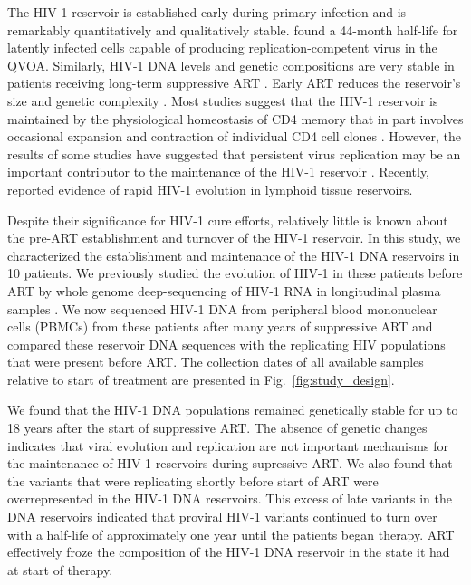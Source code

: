 \documentclass[aps,rmp,onecolumn,linenumbers]{revtex4-1}
\newcommand{\FIG}[1]{Fig.~\ref{fig:#1}}
\begin{document}
The HIV-1 reservoir is established early during primary infection and is remarkably quantitatively and qualitatively stable.  \citet{siliciano_long-term_2003} found a 44-month half-life for latently infected cells capable of producing replication-competent virus in the QVOA. Similarly, HIV-1 DNA levels and genetic compositions are very stable in patients receiving long-term suppressive ART \cite{stockenstrom_longitudinal_2015,besson_hiv-1_2014,josefsson_hiv-1_2013,kearney_lack_2014,gunthard_evolution_1999,evering_absence_2012,kieffer_absence_2004}. 
Early ART reduces the reservoir’s size and genetic complexity \cite{chomont_hiv_2009,josefsson_hiv-1_2013,lori_treatment_1999,strain_effect_2005}.
Most studies suggest that the HIV-1 reservoir is maintained by the physiological homeostasis of CD4 memory that in part involves occasional expansion and contraction of individual CD4 cell clones \cite{stockenstrom_longitudinal_2015,chomont_maintenance_2011,chomont_hiv_2009}. However, the results of some studies have suggested that persistent virus replication may be an important contributor to the maintenance of the HIV-1 reservoir \cite{buzon_hiv-1_2010,yukl_effect_2010}. Recently, \citet{lorenzo-redondo_persistent_2016} reported evidence of rapid HIV-1 evolution in lymphoid tissue reservoirs. 

Despite their significance for HIV-1 cure efforts, relatively little is known about the pre-ART establishment and turnover of the HIV-1 reservoir. In this study, we characterized the establishment and maintenance of the HIV-1 DNA reservoirs in 10 patients. We previously studied the evolution of HIV-1 in these patients before ART by whole genome deep-sequencing of HIV-1 RNA in longitudinal plasma samples \cite{zanini_population_2016}. We now sequenced HIV-1 DNA from peripheral blood mononuclear cells (PBMCs) from these patients after many years of suppressive ART and compared these reservoir DNA sequences with the replicating HIV populations that were present before ART. The collection dates of all available samples relative to start of treatment are presented in \FIG{study_design}. 

We found that the HIV-1 DNA populations remained genetically stable for up to 18 years after the start of suppressive ART. The absence of genetic changes indicates that viral evolution and replication are not important mechanisms for the maintenance of HIV-1 reservoirs during supressive ART. We also found that the variants that were replicating shortly before start of ART were overrepresented in the HIV-1 DNA reservoirs. This excess of late variants in the DNA reservoirs indicated that proviral HIV-1 variants continued to turn over with a half-life of approximately one year until the patients began therapy. ART effectively froze the composition of the HIV-1 DNA reservoir in the state it had at start of therapy. 
\end{document}
